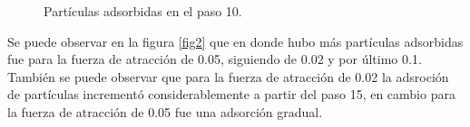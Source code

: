 \documentclass[12pt, letterpaper] {article}
\begin{document}
\begin{figure}[h!]
\centering
{}
\caption{Partículas adsorbidas en el paso 10.} \label{fig1}
\end{figure}

Se puede observar en la figura \ref{fig2} que en donde hubo más partículas adsorbidas fue para la fuerza de atracción de 0.05, siguiendo de 0.02 y por último 0.1. También se puede observar que para la fuerza de atracción de 0.02 la adsroción de partículas incrementó considerablemente a partir del paso 15, en cambio para la fuerza de atracción de 0.05 fue una adsorción gradual.
\end{document}
